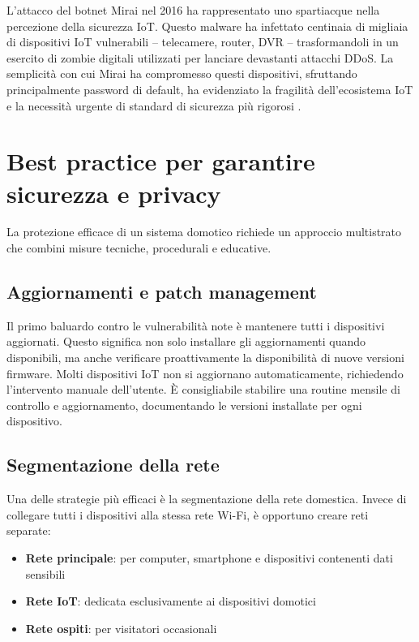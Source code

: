 L'attacco del botnet Mirai nel 2016 ha rappresentato uno spartiacque nella percezione della sicurezza IoT. Questo malware ha infettato centinaia di migliaia di dispositivi IoT vulnerabili -- telecamere, router, DVR -- trasformandoli in un esercito di zombie digitali utilizzati per lanciare devastanti attacchi DDoS. La semplicità con cui Mirai ha compromesso questi dispositivi, sfruttando principalmente password di default, ha evidenziato la fragilità dell'ecosistema IoT e la necessità urgente di standard di sicurezza più rigorosi \parencite{miraiBotnet}.

\section{Best practice per garantire sicurezza e privacy}

La protezione efficace di un sistema domotico richiede un approccio multistrato che combini misure tecniche, procedurali e educative.

\subsection{Aggiornamenti e patch management}

Il primo baluardo contro le vulnerabilità note è mantenere tutti i dispositivi aggiornati. Questo significa non solo installare gli aggiornamenti quando disponibili, ma anche verificare proattivamente la disponibilità di nuove versioni firmware. Molti dispositivi IoT non si aggiornano automaticamente, richiedendo l'intervento manuale dell'utente. È consigliabile stabilire una routine mensile di controllo e aggiornamento, documentando le versioni installate per ogni dispositivo.

\subsection{Segmentazione della rete}

Una delle strategie più efficaci è la segmentazione della rete domestica. Invece di collegare tutti i dispositivi alla stessa rete Wi-Fi, è opportuno creare reti separate:

\begin{itemize}
    \item \textbf{Rete principale}: per computer, smartphone e dispositivi contenenti dati sensibili
    \item \textbf{Rete IoT}: dedicata esclusivamente ai dispositivi domotici
    \item \textbf{Rete ospiti}: per visitatori occasionali
\end{itemize}

